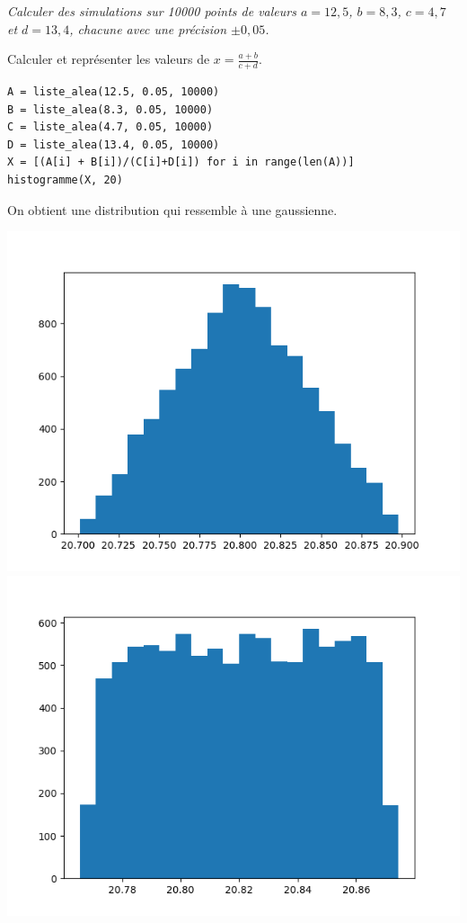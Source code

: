 \begin{Exercise}\it  Calculer des simulations sur 10000 points de valeurs $a= 12,5$, $b = 8,3$, $c = 4,7$ et $d = 13,4$, chacune avec une précision $\pm 0,05$.

Calculer et représenter les valeurs de $\displaystyle x = \frac{a+b}{c+d}$.
\end{Exercise}
\begin{Answer}
\begin{lstlisting}
A = liste_alea(12.5, 0.05, 10000)
B = liste_alea(8.3, 0.05, 10000)
C = liste_alea(4.7, 0.05, 10000)
D = liste_alea(13.4, 0.05, 10000)
X = [(A[i] + B[i])/(C[i]+D[i]) for i in range(len(A))]
histogramme(X, 20)
\end{lstlisting}
On obtient une distribution qui ressemble à une gaussienne.
\begin{center}
\includegraphics[scale=0.3]{TP/Images/TP17_histo4.png}
\includegraphics[scale=0.3]{TP/Images/TP17_histo5.png}

\end{center}
\end{Answer}
